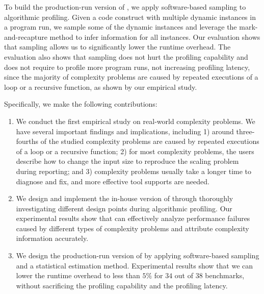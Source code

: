 To build the production-run version of \Tool,
we apply software-based sampling to algorithmic profiling.
Given a code construct with multiple dynamic instances in a program run,
we sample some of the dynamic instances and leverage the mark-and-recapture
method\citep{mark-recapture} to infer information for all instances.
Our evaluation shows that
sampling allows us to significantly lower the runtime overhead.
The evaluation also shows that sampling does not hurt the profiling capability
and does not require to profile more program runs,
not increasing profiling latency, since
the majority of complexity problems are caused by
repeated executions of a loop or a recursive function, as shown by our empirical study.



Specifically, we make the following contributions:

\begin{enumerate}

\item We conduct the first empirical study on real-world complexity problems.
We have several important findings and implications, including
1) around three-fourths of the studied complexity problems are
caused by repeated executions of a loop or a recursive function;
2) for most complexity problems,
the users describe how to change the input size to reproduce the scaling problem during reporting;
and 3) complexity problems usually take a longer time to diagnose and fix,
and more effective tool supports are needed.

\item We design and implement the in-house version of \Tool through
thoroughly investigating different design points during algorithmic profiling.
Our experimental results show that \Tool can effectively analyze performance failures
caused by different types of complexity problems and attribute complexity information accurately.

\fi

\item We design the production-run version of \Tool by applying
software-based sampling and a statistical estimation method.
Experimental results show that we can lower the runtime overhead to less than
$5\%$ for $34$ out of $38$ benchmarks,
without sacrificing the profiling capability and the profiling latency.

\end{enumerate}
